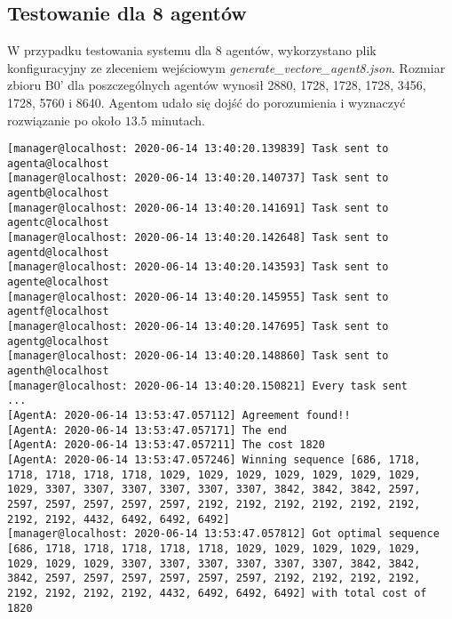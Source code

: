 \subsection{Testowanie dla 8 agentów}
W przypadku testowania systemu dla 8 agentów, wykorzystano plik konfiguracyjny ze zleceniem wejściowym \textit{generate\_vectore\_agent8.json}. Rozmiar zbioru B0' dla poszczególnych agentów wynosił 2880, 1728, 1728, 1728, 3456, 1728, 5760 i 8640. Agentom udało się dojść do porozumienia i wyznaczyć rozwiązanie po około $\num{13,5}$ minutach.
\begin{lstlisting}
[manager@localhost: 2020-06-14 13:40:20.139839] Task sent to agenta@localhost
[manager@localhost: 2020-06-14 13:40:20.140737] Task sent to agentb@localhost
[manager@localhost: 2020-06-14 13:40:20.141691] Task sent to agentc@localhost
[manager@localhost: 2020-06-14 13:40:20.142648] Task sent to agentd@localhost
[manager@localhost: 2020-06-14 13:40:20.143593] Task sent to agente@localhost
[manager@localhost: 2020-06-14 13:40:20.145955] Task sent to agentf@localhost
[manager@localhost: 2020-06-14 13:40:20.147695] Task sent to agentg@localhost
[manager@localhost: 2020-06-14 13:40:20.148860] Task sent to agenth@localhost
[manager@localhost: 2020-06-14 13:40:20.150821] Every task sent
...
[AgentA: 2020-06-14 13:53:47.057112] Agreement found!!
[AgentA: 2020-06-14 13:53:47.057171] The end
[AgentA: 2020-06-14 13:53:47.057211] The cost 1820
[AgentA: 2020-06-14 13:53:47.057246] Winning sequence [686, 1718, 1718, 1718, 1718, 1718, 1029, 1029, 1029, 1029, 1029, 1029, 1029, 1029, 3307, 3307, 3307, 3307, 3307, 3307, 3842, 3842, 3842, 2597, 2597, 2597, 2597, 2597, 2597, 2192, 2192, 2192, 2192, 2192, 2192, 2192, 2192, 4432, 6492, 6492, 6492]
[manager@localhost: 2020-06-14 13:53:47.057812] Got optimal sequence [686, 1718, 1718, 1718, 1718, 1718, 1029, 1029, 1029, 1029, 1029, 1029, 1029, 1029, 3307, 3307, 3307, 3307, 3307, 3307, 3842, 3842, 3842, 2597, 2597, 2597, 2597, 2597, 2597, 2192, 2192, 2192, 2192, 2192, 2192, 2192, 2192, 4432, 6492, 6492, 6492] with total cost of 1820
\end{lstlisting}

